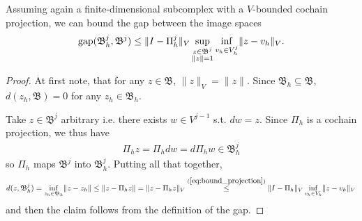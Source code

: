 \documentclass[../master_thesis.tex]{subfiles}
\begin{document}
\begin{proposition}\label{prop:gap_image_spaces}
    Assuming again a finite-dimensional subcomplex with a $V$-bounded cochain projection,
    we can bound the gap between the image spaces
    \begin{align*}
        \operatorname{gap} (\mathfrak{B}^j_h, \mathfrak{B}^j) 
        \leq \lVert I - \Pi_h^j \rVert _V  \sup_{\substack{z \in \mathfrak{B}^j \\ \lVert z \rVert = 1} } 
        \inf_{v_h \in V^j_h} \lVert z - v_h \rVert _V.
    \end{align*}
\end{proposition}
\begin{proof}
    At first note, that for any $z \in \mathfrak{B}$, $\lVert z \rVert _V = \lVert z \rVert$.
    Since $\mathfrak{B}_h \subseteq \mathfrak{B}$, $d(z_h, \mathfrak{B}) = 0$ for any 
    $z_h \in \mathfrak{B}_h$. 
    
    Take $z \in \mathfrak{B}^j$ arbitrary i.e. there exists $w \in V^{j-1}$ s.t. 
    $dw = z$.
    Since $\Pi_h$  is a cochain projection, we thus have 
    \begin{align*}
        \Pi_h z = \Pi_h dw = d \Pi_h w \in \mathfrak{B}_h^j
    \end{align*}
    so $\Pi_h$ maps $\mathfrak{B}^j$ into $\mathfrak{B}^j_h$. Putting all that together,
    \begin{align*}
        d(z,\mathfrak{B}^j_h) = \inf_{z_h \in \mathfrak{B}_h} \lVert z - z_h \rVert 
        \leq \lVert z - \Pi_h z \rVert 
        = \lVert z - \Pi_h z \rVert _V
        \stackrel{(\ref{eq:bound_projection})}{\leq} \lVert I - \Pi_h \rVert _V \inf_{v_h \in V_h} \lVert z - v_h \rVert _V
    \end{align*}
    and then the claim follows from the definition of the gap.
\end{proof}
\end{document}
